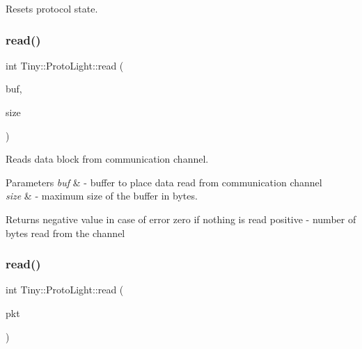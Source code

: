 Resets protocol state. \mbox{\label{classTiny_1_1ProtoLight_acf18a8b73ee6c6394270c903ad7882b8}} 
\subsubsection{\texorpdfstring{read()}{read()}\hspace{0.1cm}{\footnotesize\ttfamily [1/2]}}
{\footnotesize\ttfamily int Tiny\+::\+Proto\+Light\+::read (\begin{DoxyParamCaption}\item[{char $\ast$}]{buf,  }\item[{int}]{size }\end{DoxyParamCaption})}

Reads data block from communication channel. 
\begin{DoxyParams}{Parameters}
{\em buf} & -\/ buffer to place data read from communication channel \\
\hline
{\em size} & -\/ maximum size of the buffer in bytes. \\
\hline
\end{DoxyParams}
\begin{DoxyReturn}{Returns}
negative value in case of error zero if nothing is read positive -\/ number of bytes read from the channel 
\end{DoxyReturn}
\mbox{\label{classTiny_1_1ProtoLight_aa040cbf16f9c074959fb410db6858b9b}} 
\subsubsection{\texorpdfstring{read()}{read()}\hspace{0.1cm}{\footnotesize\ttfamily [2/2]}}
{\footnotesize\ttfamily int Tiny\+::\+Proto\+Light\+::read (\begin{DoxyParamCaption}\item[{\hyperlink{classTiny_1_1IPacket}{I\+Packet} \&}]{pkt }\end{DoxyParamCaption})}

